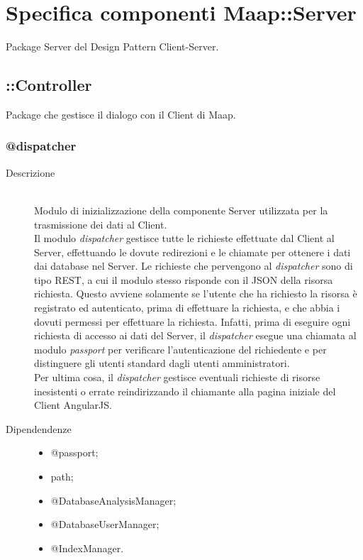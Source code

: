 \section{Specifica componenti Maap::Server}

Package Server del Design Pattern Client-Server. 

\subsection{::Controller}
Package che gestisce il dialogo con il Client di Maap. 
\subsubsection{@dispatcher}

\begin{description}
 \item[Descrizione] \hfill \\
Modulo di inizializzazione della componente Server utilizzata per la trasmissione dei dati al Client. \\
Il modulo \textit{dispatcher} gestisce tutte le richieste effettuate dal Client al Server, effettuando le dovute redirezioni e le chiamate per ottenere i dati dai database nel Server. Le richieste che pervengono al 
\textit{dispatcher} sono di tipo REST, a cui il modulo stesso risponde con il JSON della risorsa richiesta. 
Questo avviene solamente se l'utente che ha richiesto la risorsa è registrato ed autenticato, prima di 
effettuare la richiesta, e che abbia i dovuti permessi per effettuare la richiesta. Infatti, prima di eseguire ogni richiesta di accesso ai dati del Server, il \textit{dispatcher} esegue una chiamata al modulo \textit{passport} per verificare l'autenticazione del richiedente e per distinguere gli utenti standard dagli utenti amministratori. \\
Per ultima cosa, il \textit{dispatcher} gestisce eventuali richieste di risorse inesistenti o errate reindirizzando il chiamante alla pagina iniziale del Client AngularJS.
 \item[Dipendendenze] \hfill
 \begin{itemize}
 \item @passport;
 \item path;
 \item @DatabaseAnalysisManager;
 \item @DatabaseUserManager;
 \item @IndexManager.
 \end{itemize}
 

\end{description}
